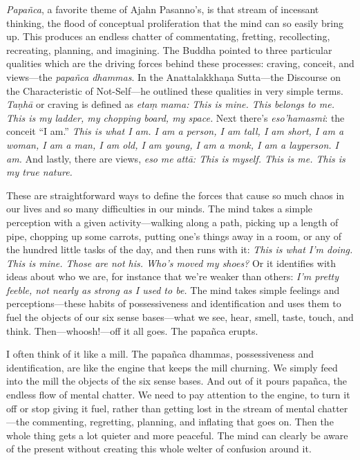 
\emph{Papañca}, a favorite theme of Ajahn Pasanno's, is that stream of 
incessant thinking, the flood of conceptual proliferation that the mind 
can so easily bring up. This produces an endless chatter of 
commentating, fretting, recollecting, recreating, planning, and 
imagining. The Buddha pointed to three particular qualities which are 
the driving forces behind these processes: craving, conceit, and 
views---the \emph{papañca dhammas}. In the Anattalakkhaṇa 
Sutta---the Discourse on the Characteristic of Not-Self---he outlined 
these qualities in very simple terms. \emph{Taṇhā} or craving is 
defined as \emph{etaṃ} \emph{mama:} \emph{This is mine. This belongs 
to me. This is my ladder, my chopping board, my space.} Next there's 
\emph{eso'hamasmi}: the conceit ``I am.'' \emph{This is what I am. I am 
a person, I am tall, I am short, I am a woman, I am a man, I am old, I 
am young, I am a monk, I am a layperson. I am.} And lastly, there are 
views, \emph{eso} \emph{me} \emph{attā: This is myself. This is me. 
This is my true nature.}

These are straightforward ways to define the forces that cause so much 
chaos in our lives and so many difficulties in our minds. The mind 
takes a simple perception with a given activity---walking along a path, 
picking up a length of pipe, chopping up some carrots, putting one's 
things away in a room, or any of the hundred little tasks of the day, 
and then runs with it: \emph{This is what I'm doing. This is mine. 
Those are not his. Who's moved my shoes?} Or it identifies with ideas 
about who we are, for instance that we're weaker than others: \emph{I'm 
pretty feeble, not nearly as strong as I used to be.} The mind takes 
simple feelings and perceptions---these habits of possessiveness and 
identification and uses them to fuel the objects of our six sense 
bases---what we see, hear, smell, taste, touch, and think. 
Then---whoosh!---off it all goes. The papañca erupts.

I often think of it like a mill. The papañca dhammas, possessiveness 
and identification, are like the engine that keeps the mill churning. 
We simply feed into the mill the objects of the six sense bases. And 
out of it pours papañca, the endless flow of mental chatter. We need 
to pay attention to the engine, to turn it off or stop giving it fuel, 
rather than getting lost in the stream of mental chatter---the 
commenting, regretting, planning, and inflating that goes on. Then the 
whole thing gets a lot quieter and more peaceful. The mind can clearly 
be aware of the present without creating this whole welter of confusion 
around it.

